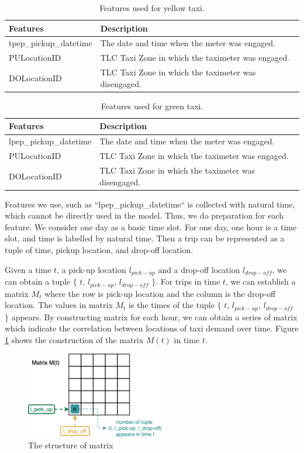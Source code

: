 \documentclass[11pt]{article}
\begin{document}
\begin{table}[h]
\centering
\begin{tabular}{ll}
\hline
Features & Description \\\hline
tpep\_pickup\_datetime&The date and time when the meter was engaged. \\
PULocationID & TLC Taxi Zone in which the taximeter was engaged.\\
DOLocationID&TLC Taxi Zone in which the taximeter was disengaged.\\\hline
\end{tabular}
\caption{Features used for yellow taxi.}
\label{tab:yellow_features}
\end{table}

 
\begin{table}[h]
\centering
\begin{tabular}{ll}
\hline
Features & Description \\\hline
lpep\_pickup\_datetime&The date and time when the meter was engaged. \\
PULocationID & TLC Taxi Zone in which the taximeter was engaged.\\
DOLocationID&TLC Taxi Zone in which the taximeter was disengaged.\\\hline
\end{tabular}
\caption{Features used for green taxi.}
\label{tab:green_features}
\end{table}

Features we use, such as ``lpep\_pickup\_datetime`` is collected with natural time, which cannot be directly used in the model. Thus, we do preparation for each feature. We consider one day as a basic time slot. For one day, one hour is a time slot, and time is labelled by natural time.
Then a trip can be represented as a tuple of time, pickup location, and drop-off location.

Given a time $t$, a pick-up location $l_{pick-up}$ and a drop-off location $l_{drop-off}$, we can obtain a tuple $\{$ $t$, $l_{pick-up}$, $l_{drop-off}$ $\}$. For trips in time $t$, we can establish a matrix $M_t$ where the row is pick-up location and the column is the drop-off location. The values in matrix $M_t$ is the times of the tuple $\{$ $t$, $l_{pick-up}$, $l_{drop-off}$ $\}$ appears. By constructing matrix for each hour, we can obtain a series of matrix which indicate the correlation between locations of taxi demand over time. Figure \ref{Fig:matrix} shows the construction of the matrix $M(t)$ in time $t$.

\begin{figure}[ht]
\includegraphics[width=0.55\textwidth]{plots/matrix.png}
\centering
\caption{The structure of matrix}
\label{Fig:matrix}
\end{figure}
\end{document}
